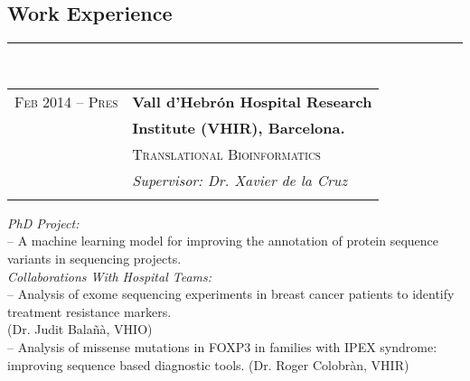 \documentclass[10pt]{article} %
\begin{document}
\begin{minipage}[t]{0.5\textwidth} %
\vspace{0pt} %
	

\begin{spacing}{0.0}
\section{Work Experience}
\end{spacing}
\rule{9.5cm}{0.4pt}
\\

\begin{spacing}{1.2}
\begin{tabular}{rl} %
\textsc{Feb 2014 -- Pres}	 & \textbf{Vall d'Hebrón Hospital Research }\\
& \textbf{Institute (VHIR), Barcelona.}\\
& \textsc{Translational Bioinformatics}\\
& \textit{Supervisor: Dr. Xavier de la Cruz}\\ \\
\end{tabular}
\normalsize{\emph{PhD Project:} \\-- A machine learning model for improving the annotation of protein sequence variants in sequencing projects.\vspace{0.3cm}}\\
\normalsize{\emph{Collaborations With Hospital Teams: }}\\
\normalsize{-- Analysis of exome sequencing experiments in breast cancer patients to identify treatment resistance markers. \\ (Dr. Judit Balañà, VHIO)}\\
\normalsize{-- Analysis of missense mutations in FOXP3 in families with IPEX syndrome: improving sequence based diagnostic tools. (Dr. Roger Colobràn, VHIR)\vspace{0.3cm}}\\



\end{spacing}
\end{minipage}
\end{document}
